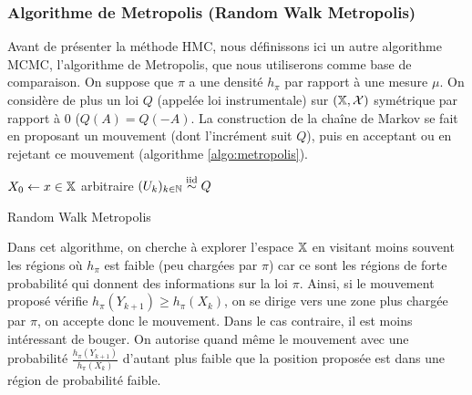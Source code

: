 \documentclass[10pt,a4paper]{article}
\begin{document}
\subsubsection{Algorithme de Metropolis (Random Walk Metropolis)}

Avant de présenter la méthode HMC, nous définissons ici un autre algorithme MCMC, l'algorithme de Metropolis, que nous utiliserons comme base de comparaison.
On suppose que $\pi$ a une densité $h_\pi$ par rapport à une mesure $\mu$. On considère de plus un loi $Q$ (appelée loi instrumentale) sur $(\mathbb{X}, \mathcal{X})$ symétrique par rapport à $0$ ($Q(A) = Q(-A)$. La construction de la chaîne de Markov se fait en proposant un mouvement (dont l'incrément suit $Q$), puis en acceptant ou en rejetant ce mouvement (algorithme \ref{algo:metropolis}).

\begin{center}
	\begin{algorithm}[H]
		$X_0 \leftarrow x \in \mathbb{X}$ arbitraire\;
		$(U_k)_{k \in \mathbb{N}} \stackrel{\rm iid}{\sim} Q$ \;
		\caption{Random Walk Metropolis}
		\label{algo:metropolis}
	\end{algorithm}
\end{center}

Dans cet algorithme, on cherche à explorer l'espace $\mathbb{X}$ en visitant moins souvent les régions où $h_\pi$ est faible (peu chargées par $\pi$) car ce sont les régions de forte probabilité qui donnent des informations sur la loi $\pi$. Ainsi, si le mouvement proposé vérifie $h_\pi(Y_{k+1}) \geq h_\pi(X_k)$, on se dirige vers une zone plus chargée par $\pi$, on accepte donc le mouvement. Dans le cas contraire, il est moins intéressant de bouger. On autorise quand même le mouvement avec une probabilité $\frac{h_\pi(Y_{k+1})}{h_\pi(X_k)}$ d'autant plus faible que la position proposée est dans une région de probabilité faible.

\end{document}
